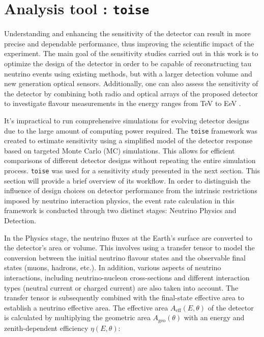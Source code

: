 \section{Analysis tool : \texttt{toise}}
\label{sec:toise}
Understanding and enhancing the sensitivity of the detector can result in more precise and dependable performance, thus improving the scientific impact of the experiment. The main goal of the sensitivity studies carried out in this work is to optimize the design of the detector in order to be capable of reconstructing tau neutrino events using existing methods, but with a larger detection volume and new generation optical sensors. Additionally, one can also assess the sensitivity of the detector by combining both radio and optical arrays of the proposed detector to investigate flavour measurements in the energy ranges from TeV to EeV .

It's impractical to run comprehensive simulations for evolving detector designs due to the large amount of computing power required. The \texttt{toise}  framework was created to estimate sensitivity using a simplified model of the detector response based on targeted Monte Carlo (MC) simulations. This allows for efficient comparisons of different detector designs without repeating the entire simulation process. \texttt{toise} was used for a sensitivity study presented in the next section. This section will provide a brief overview of its workflow. In order to distinguish the influence of design choices on detector performance from the intrinsic restrictions imposed by neutrino interaction physics, the event rate calculation in this framework is conducted through two distinct stages: Neutrino Physics and Detection.

In the Physics stage, the neutrino fluxes at the Earth's surface are converted to the detector's area or volume. This involves using a transfer tensor to model the conversion between the initial neutrino flavour states and the observable final states (muons, hadrons, etc.). In addition, various aspects of neutrino interactions, including neutrino-nucleon cross-sections and different interaction types (neutral current or charged current) are also taken into account. The transfer tensor is subsequently combined with the final-state effective area to establish a neutrino effective area. The effective area \( A_{\text{eff}}(E, \theta) \) of the detector is calculated by multiplying the geometric area \( A_{\text{geo}}(\theta) \) with an energy and zenith-dependent efficiency \( \eta(E, \theta) \):

